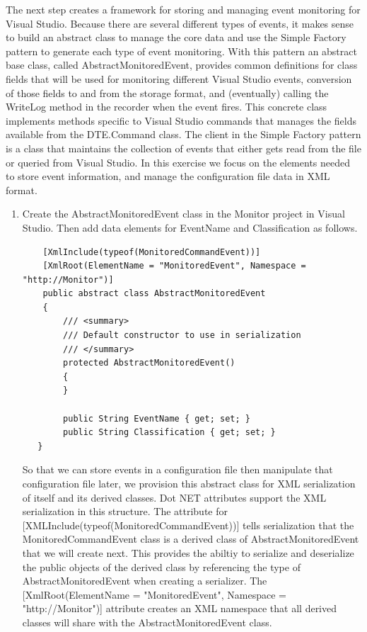  \begin{Exercise}[ type={program}, difficulty={1}]

The next step creates a framework for storing and managing event monitoring for Visual Studio.  Because there are several different types of events, it makes sense to build an abstract class to manage the core data and use the Simple Factory pattern to generate each type of event monitoring.  With this pattern an abstract base class, called AbstractMonitoredEvent, provides common definitions for class fields that will be used for monitoring different Visual Studio events, conversion of those fields to and from the storage format, and (eventually) calling the WriteLog method in the recorder when the event fires.  This concrete class implements methods specific to Visual Studio commands that manages the fields available from the DTE.Command class.  The client in the Simple Factory pattern is a class that maintains the collection of events that either gets read from the file or queried from Visual Studio.   In this exercise we focus on the elements needed to store event information, and manage the configuration file data in XML format.

\begin{enumerate}
\item
Create the AbstractMonitoredEvent class in the Monitor project in Visual Studio.  Then add data elements for EventName and Classification as follows.

\begin{lstlisting}
    [XmlInclude(typeof(MonitoredCommandEvent))]
    [XmlRoot(ElementName = "MonitoredEvent", Namespace = "http://Monitor")]
    public abstract class AbstractMonitoredEvent
    {
        /// <summary>
        /// Default constructor to use in serialization
        /// </summary>
        protected AbstractMonitoredEvent()
        {
        }

        public String EventName { get; set; }
        public String Classification { get; set; }
   }
\end{lstlisting}

So that we can store events in a configuration file then manipulate that configuration file later, we provision this abstract class for XML serialization of itself and its derived classes.  Dot NET attributes support the XML serialization in this structure.  The attribute for [XMLInclude(typeof(MonitoredCommandEvent))] tells serialization that the MonitoredCommandEvent class is a derived class of AbstractMonitoredEvent that we will create next.  This provides the abiltiy to serialize and deserialize the public objects of the derived class by referencing the type of AbstractMonitoredEvent when creating a serializer.  The [XmlRoot(ElementName = "MonitoredEvent", Namespace = "http://Monitor")] attribute creates an XML namespace that all derived classes will share with the AbstractMonitoredEvent class.


\end{enumerate}
\end{Exercise}
